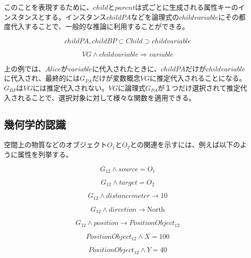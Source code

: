 \documentclass[12pt]{article}
\begin{document}
このことを表現するために、\(child\)と\(parent\)は式ごとに生成される属性キーのインスタンスとする。インスタンス\(childPA\)などを論理式の\(childvariable\)にその都度代入することで、一般的な推論に利用することができる。

\begin{equation} childPA,childBP \subset Child \supset childvariable\end{equation}

\begin{equation} VG \wedge childvariable \Rightarrow variable\end{equation}

上の例では、\(Alice\)が\(variable\)に代入されたときに、\(childPA\)だけが\(childvariable\)に代入され、最終的には\(G_{PA}\)だけが変数概念\(VG\)に推定代入されることになる。\(G_{BP}\)は\(VG\)には推定代入されない。\(VG\)に論理式\(G_{PA}\)が１つだけ選択されて推定代入されることで、選択対象に対して様々な関数を適用できる。

\subsection{幾何学的認識}\label{ux5e7eux4f55ux5b66ux7684ux8a8dux8b58}

空間上の物質などのオブジェクト\(O_1\)と\(O_2\)との関連を示すには、例えば以下のように属性を列挙する。

\begin{equation} G_{12} \wedge source = O_1 \end{equation}

\begin{equation} G_{12} \wedge target = O_2 \end{equation}

\begin{equation} G_{12} \wedge distancemeter \rightarrow \text{10} \end{equation}

\begin{equation} G_{12} \wedge direction \rightarrow \text{North} \end{equation}

\begin{equation} G_{12} \wedge position \rightarrow PositionObject_{12}\end{equation}

\begin{equation} PositionObject_{12} \wedge X = \text{100} \end{equation}

\begin{equation} PositionObject_{12} \wedge Y = \text{40} \end{equation}
\end{document}
